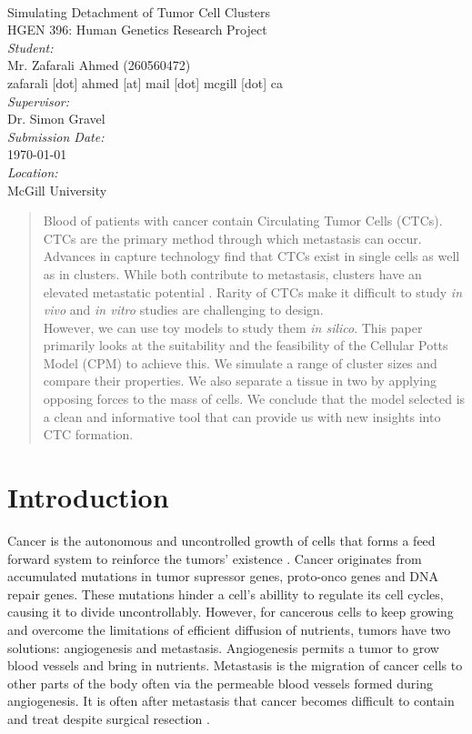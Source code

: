 \documentclass[12pt]{article}
\begin{document}
\begin{titlepage}
	\begin{center}
		~\\[2.0cm]
		{\Huge Simulating Detachment of Tumor Cell Clusters}\\[1.5cm]
		{\Large HGEN 396: Human Genetics Research Project}\\[6.5cm]
		\emph{Student:}\\
		Mr. Zafarali Ahmed (260560472)\\
		{\scriptsize zafarali [dot] ahmed [at] mail [dot] mcgill [dot] ca} \\[1.0cm]
		\emph{Supervisor:}\\
		Dr. Simon Gravel\\[1.0cm]
		\emph{Submission Date:}\\
		\today\\[1.0cm]
		\emph{Location:}\\
		McGill University
	\end{center}
\end{titlepage}

\begin{abstract}
Blood of patients with cancer contain Circulating Tumor Cells (CTCs). CTCs are the primary method through which metastasis can occur. Advances in capture technology find that CTCs exist in single cells as well as in clusters. While both contribute to metastasis, clusters have an elevated metastatic potential \cite{Aceto2014}. Rarity of CTCs make it difficult to study \emph{in vivo} and \emph{in vitro} studies are challenging to design. \\
However, we can use toy models to study them \emph{in silico}. This paper primarily looks at the suitability and the feasibility of the Cellular Potts Model (CPM) to achieve this. We simulate a range of cluster sizes and compare their properties. We also separate a tissue in two by applying opposing forces to the mass of cells. We conclude that the model selected is a clean and informative tool that can provide us with new insights into CTC formation.
\end{abstract}

\section{Introduction}
Cancer is the autonomous and uncontrolled growth of cells that forms a feed forward system to reinforce the tumors’ existence \cite{hallmarks}. Cancer originates from accumulated mutations in tumor supressor genes, proto-onco genes and DNA repair genes. These mutations hinder a cell's abillity to regulate its cell cycles, causing it to divide uncontrollably. However, for cancerous cells to keep growing and overcome the limitations of efficient diffusion of nutrients, tumors have two solutions: angiogenesis and metastasis. Angiogenesis permits a tumor to grow blood vessels and bring in nutrients. Metastasis is the migration of cancer cells to other parts of the body often via the permeable blood vessels formed during angiogenesis. It is often after metastasis that cancer becomes difficult to contain and treat despite surgical resection \cite{Demicheli2008}.
\end{document}
